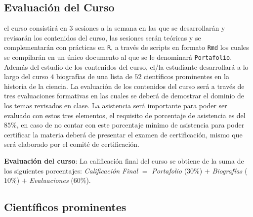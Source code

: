 \subsection{Evaluaci\'on del Curso}

 el curso consistir\'a en 3 sesiones a la semana en las que se desarrollar\'an y revisar\'an los contenidos del curso, las sesiones ser\'an te\'oricas y se complementar\'an con pr\'acticas en \texttt{R}, a trav\'es de scripts en formato \texttt{Rmd} los cuales se compilar\'an en un \'unico documento al que se le denominar\'a \texttt{Portafolio}. Adem\'as del estudio de los contenidos del curso, el/la estudiante desarrollar\'a a lo largo del curso $4$ biograf\'ias de una lista de $52$ cient\'ificos prominentes en la historia de la ciencia. La evaluaci\'on de los contenidos del curso ser\'a a trav\'es de tres evaluaciones formativas en las cuales se deber\'a de demostrar el dominio de los temas revisados en clase. La asistencia ser\'a importante para poder ser evaluado con estos tres elementos, el requisito de porcentaje de asistencia es del $85\%$, en caso de no contar con este porcentaje m\'inimo de asistencia para poder certificar la materia deber\'a de presentar el examen de certificaci\'on, mismo que ser\'a elaborado por el comit\'e de certificaci\'on.


\textbf{Evaluaci\'on del curso}: La calificaci\'on final del curso se obtiene de la suma de los siguientes porcentajes: \textit{Calificaci\'on Final} $=$ \textit{Portafolio} (30\%) $+$ \textit{Biograf\'ias} ($10\%$) $ +$ \textit{Evaluaciones} ($60\%$).

\subsection{Cient\'ificos prominentes}

